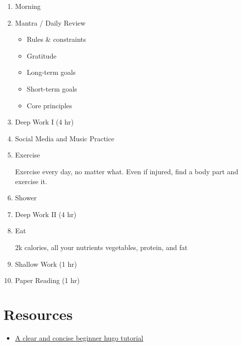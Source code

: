 \begin{enumerate}
\item
	Morning

\item
	Mantra / Daily Review
	\begin{itemize}
	\item
		Rules \& constraints
	\item
		Gratitude
	\item
		Long-term goals
	\item
		Short-term goals
	\item
		Core principles
	\end{itemize}

\item
	Deep Work I (4 hr)

\item
	Social Media and Music Practice

\item
	Exercise

	Exercise every day, no matter what. Even if injured, find a body part and exercise it.

\item
	Shower

\item
	Deep Work II (4 hr)

\item
	Eat

	2k calories, all your nutrients
	vegetables, protein, and fat

\item
	Shallow Work (1 hr)

\item
	Paper Reading (1 hr)

\end{enumerate}

\section{Resources}
\begin{itemize}
\item
	\href{https://www.linkedin.com/learning/learning-static-site-building-with-hugo-2/build-a-static-site-with-hugo?resume=false}{A clear and concise beginner hugo tutorial}
\end{itemize}


